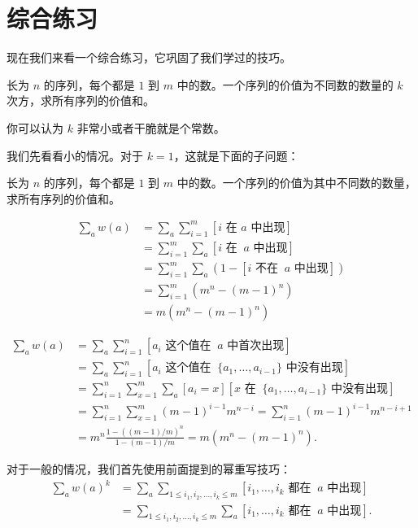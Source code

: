 \section{综合练习}
    现在我们来看一个综合练习，它巩固了我们学过的技巧。
    \begin{example}
        长为 $n$ 的序列，每个都是 $1$ 到 $m$ 中的数。一个序列的价值为不同数的数量的 $k$ 次方，求所有序列的价值和。
        
        你可以认为 $k$ 非常小或者干脆就是个常数。
    \end{example}
    我们先看看小的情况。对于 $k=1$，这就是下面的子问题：
    \begin{example}
        长为 $n$ 的序列，每个都是 $1$ 到 $m$ 中的数。一个序列的价值为其中不同数的数量，求所有序列的价值和。
    \end{example}
    \begin{solution}
            $$
            \begin{aligned}
            \sum_{a}w(a)&=\sum_a\sum_{i=1}^m[i\text{ 在 }a\text{ 中出现}]\\
            &=\sum_{i=1}^m\sum_a[i\text{ 在 }\ a\text{ 中出现}]\\
            &=\sum_{i=1}^m\sum_a(1-[i\text{ 不在 }\ a\text{ 中出现}])\\
            &=\sum_{i=1}^m(m^n-(m-1)^n)\\
            &=m(m^n-(m-1)^n)
            \end{aligned}
            $$
    \end{solution}
    \begin{solution}[另解]
        $$
        \begin{aligned}
        \sum_{a}w(a)&=\sum_a\sum_{i=1}^n[a_i\text{ 这个值在 }\ a\text{ 中首次出现}]\\
        &=\sum_a\sum_{i=1}^n[a_i\text{ 这个值在 }\ \{a_1,\ldots,a_{i-1}\}\text{ 中没有出现}]\\
        &=\sum_{i=1}^n\sum_{x=1}^m\sum_{a}[a_i=x][x\text{ 在 }\ \{a_1,\ldots,a_{i-1}\}\text{ 中没有出现}]\\
        &=\sum_{i=1}^n\sum_{x=1}^m(m-1)^{i-1}m^{n-i}=\sum_{i=1}^n(m-1)^{i-1}m^{n-i+1}\\
        &=m^{n}\frac{1-((m-1)/m)^n}{1-(m-1)/m}=m(m^n-(m-1)^n).
        \end{aligned}
        $$
    \end{solution}
    对于一般的情况，我们首先使用前面提到的幂重写技巧：
    $$
    \begin{aligned}
    \sum_{a}w(a)^k&=\sum_a\sum_{1\le i_1,i_2,\ldots,i_k\le m}[i_1,\ldots,i_k\text{ 都在 }\ a\text{ 中出现}]\\
    &=\sum_{1\le i_1,i_2,\ldots,i_k\le m}\sum_a[i_1,\ldots,i_k\text{ 都在 }\ a\text{ 中出现}].
    \end{aligned}
    $$

